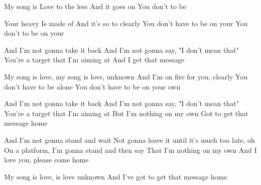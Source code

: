 \resetVars%
%
%
%
%
\makeheader%
\lyrics%
My song is  
Love to the less 
And it goes on 
You don't  to be 

Your heavy  
Is made of  
And it's so  to  clearly
You don't have to be on your 
You don't  to be on your 

And I'm not gonna take it back
And I'm not gonna say, "I don't mean that"
You're a target that I'm aiming at
And I get that message 

My song is love, my song is love, unknown
And I'm on fire for you, clearly
You don't have to be alone
You don't have to be on your own

And I'm not gonna take it back
And I'm not gonna say, "I don't mean that"
You're a target that I'm aiming at
But I'm nothing on my own
Got to get that message home

And I'm not gonna stand and wait
Not gonna leave it until it's much too late, oh
On a platform, I'm gonna stand and then say
That I'm nothing on my own
And I love you, please come home

My song is love, is love unknown
And I've got to get that message home

\next
